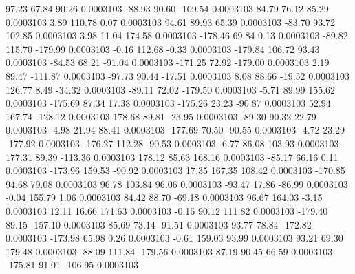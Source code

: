        97.23       67.84       90.26     0.0003103
      -88.93       90.60     -109.54     0.0003103
       84.79       76.12       85.29     0.0003103
        3.89      110.78        0.07     0.0003103
       94.61       89.93       65.39     0.0003103
      -83.70       93.72      102.85     0.0003103
        3.98       11.04      174.58     0.0003103
     -178.46       69.84        0.13     0.0003103
      -89.82      115.70     -179.99     0.0003103
       -0.16      112.68       -0.33     0.0003103
     -179.84      106.72       93.43     0.0003103
      -84.53       68.21      -91.04     0.0003103
     -171.25       72.92     -179.00     0.0003103
        2.19       89.47     -111.87     0.0003103
      -97.73       90.44      -17.51     0.0003103
        8.08       88.66      -19.52     0.0003103
      126.77        8.49      -34.32     0.0003103
      -89.11       72.02     -179.50     0.0003103
       -5.71       89.99      155.62     0.0003103
     -175.69       87.34       17.38     0.0003103
     -175.26       23.23      -90.87     0.0003103
       52.94      167.74     -128.12     0.0003103
      178.68       89.81      -23.95     0.0003103
      -89.30       90.32       22.79     0.0003103
       -4.98       21.94       88.41     0.0003103
     -177.69       70.50      -90.55     0.0003103
       -4.72       23.29     -177.92     0.0003103
     -176.27      112.28      -90.53     0.0003103
       -6.77       86.08      103.93     0.0003103
      177.31       89.39     -113.36     0.0003103
      178.12       85.63      168.16     0.0003103
      -85.17       66.16        0.11     0.0003103
     -173.96      159.53      -90.92     0.0003103
       17.35      167.35      108.42     0.0003103
     -170.85       94.68       79.08     0.0003103
       96.78      103.84       96.06     0.0003103
      -93.47       17.86      -86.99     0.0003103
       -0.04      155.79        1.06     0.0003103
       84.42       88.70      -69.18     0.0003103
       96.67      164.03       -3.15     0.0003103
       12.11       16.66      171.63     0.0003103
       -0.16       90.12      111.82     0.0003103
     -179.40       89.15     -157.10     0.0003103
       85.69       73.14      -91.51     0.0003103
       93.77       78.84     -172.82     0.0003103
     -173.98       65.98        0.26     0.0003103
       -0.61      159.03       93.99     0.0003103
       93.21       69.30      179.48     0.0003103
      -88.09      111.84     -179.56     0.0003103
       87.19       90.45       66.59     0.0003103
     -175.81       91.01     -106.95     0.0003103
